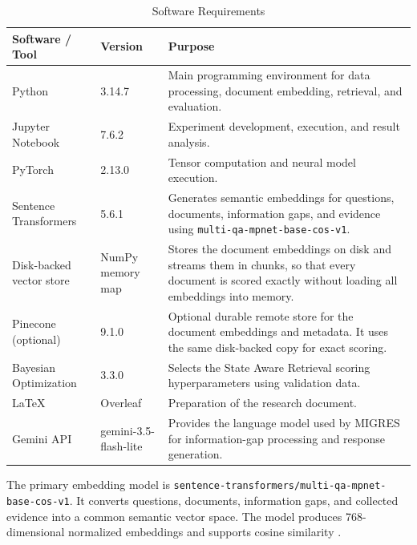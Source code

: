 \documentclass[12pt,a4paper]{report}
\begin{document}
\begin{table}[H]
\centering
\caption{Software Requirements}
\label{tab:software-requirements}
\renewcommand{\arraystretch}{1.2}
\begin{tabular}{|p{1.65in}|p{1.45in}|p{2.95in}|}
\hline
\textbf{Software / Tool} & \textbf{Version} & \textbf{Purpose} \\ \hline

Python & 3.14.7 &
Main programming environment for data processing, document embedding,
retrieval, and evaluation. \\ \hline

Jupyter Notebook & 7.6.2 &
Experiment development, execution, and result analysis. \\ \hline

PyTorch & 2.13.0 &
Tensor computation and neural model execution. \\ \hline

Sentence Transformers & 5.6.1 &
Generates semantic embeddings for questions, documents, information
gaps, and evidence using
\texttt{multi-qa-mpnet-base-cos-v1}. \\ \hline

Disk-backed vector store & NumPy memory map &
Stores the document embeddings on disk and streams them in chunks, so that every document is scored exactly without loading all embeddings into memory. \\ \hline

Pinecone (optional) & 9.1.0 &
Optional durable remote store for the document embeddings and metadata. It uses the same disk-backed copy for exact scoring. \\ \hline

Bayesian Optimization & 3.3.0 &
Selects the State Aware Retrieval scoring hyperparameters using
validation data. \\ \hline

LaTeX & Overleaf &
Preparation of the research document. \\ \hline

Gemini API & gemini-3.5-flash-lite &
Provides the language model used by MIGRES for information-gap
processing and response generation. \\ \hline

\end{tabular}
\end{table}

The primary embedding model is
\texttt{sentence-transformers/multi-qa-mpnet-base-cos-v1}. It converts
questions, documents, information gaps, and collected evidence into a
common semantic vector space. The model produces 768-dimensional
normalized embeddings and supports cosine similarity
\cite{reimers2019sentence,st2020mpnet}.
\end{document}
